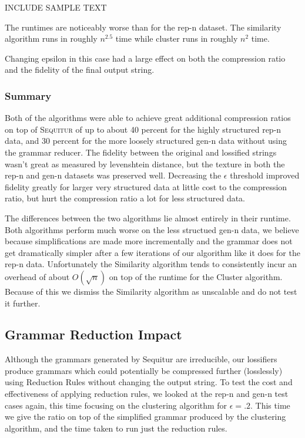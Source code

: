 \documentclass[11pt]{article}
\newcommand{\Sequitur}{\textsc{Sequitur}\xspace}
\begin{document}
INCLUDE SAMPLE TEXT


The runtimes are noticeably worse than for the rep-n dataset. The
similarity algorithm runs in roughly $n^{2.5}$ time while cluster
runs in roughly $n^2$ time. 


Changing epsilon in this case had a large effect on both the compression
ratio and the fidelity of the final output string.

\subsubsection{Summary}

Both of the algorithms were able to achieve great additional compression
ratios on top of \Sequitur of up to about 40 percent for the highly
structured rep-n data, and 30 percent for the more loosely structured
gen-n data without using the grammar reducer. The fidelity between
the original and lossified strings wasn't great as measured by
levenshtein distance, but the texture in both the rep-n and
gen-n datasets was preserved well. Decreasing the $\epsilon$ threshold
improved fidelity greatly for larger very structured data at little
cost to the compression ratio, but hurt the compression ratio
a lot for less structured data.

The differences between the two algorithms lie almost entirely in their
runtime. Both algorithms perform much worse on the less structued
gen-n data, we believe because simplifications are made more incrementally
and the grammar does not get dramatically simpler after a few iterations
of our algorithm like it does for the rep-n data.
Unfortunately the Similarity algorithm tends to consistently incur
an overhead of about $O(\sqrt{n})$ on top of the runtime for the
Cluster algorithm. Because of this we dismiss the Similarity algorithm
as unscalable and do not test it further.

\subsection{Grammar Reduction Impact}
Although the grammars generated by Sequitur are irreducible,
our lossifiers produce grammars which could potentially be
compressed further (losslessly) using Reduction Rules without
changing the output string. To test the cost and
effectiveness of applying reduction rules, we looked at the
rep-n and gen-n test cases again, this time focusing on the
clustering algorithm for $\epsilon = .2$. This time we give the ratio
on top of the simplified grammar produced by the clustering algorithm,
and the time taken to run just the reduction rules.
\end{document}
